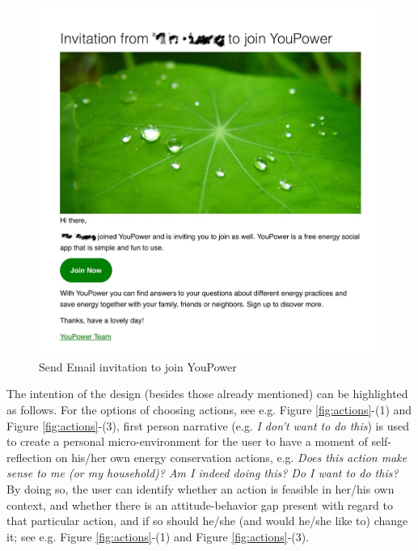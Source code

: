 \begin{figure}[h!]
\begin{center}
\begin{minipage}[t!]{0.65\linewidth}
         \includegraphics[width=1\linewidth]{img/invite2.jpg}    
        \end{minipage}
      \end{center}
      \caption{Send Email invitation to join YouPower }\label{fig:invite}
\end{figure}

The intention of the design (besides those already mentioned) can be highlighted as follows. For the options of choosing actions, see e.g. Figure \ref{fig:actions}-(1) and Figure \ref{fig:actions}-(3), first person narrative (e.g. \textit{I don't want to do this}) is used to create a personal micro-environment for the user \citep{Crumlish2009} to have a moment of self-reflection on his/her own energy conservation actions, e.g. \textit{Does this action make sense to me (or my household)? Am I indeed doing this? Do I want to do this?} By doing so, the user can identify whether an action is feasible in her/his own context, and whether there is an attitude-behavior gap present with regard to that particular action, and if so should he/she (and would he/she like to) change it; see e.g. Figure \ref{fig:actions}-(1) and Figure \ref{fig:actions}-(3). 

